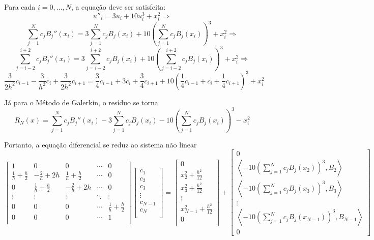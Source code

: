 \documentclass{article}
\begin{document}
    Para cada $i = 0, \dots, N$, a equação deve ser satisfeita:
    $$ u''_i = 3u_i + 10u_i^3 + x_i^2 \Rightarrow$$
    $$ \sum_{j = 1}^Nc_jB_j''(x_i) = 3\sum_{j = 1}^Nc_jB_j(x_i) + 10\left(\sum_{j = 1}^Nc_jB_j(x_i)\right)^3 + x_i^2 \Rightarrow$$
    $$ \sum_{j = i - 2}^{i + 2}c_jB_j''(x_i) = 3\sum_{j = i - 2}^{i + 2}c_jB_j(x_i) + 10\left(\sum_{j = i - 2}^{i + 2}c_jB_j(x_i)\right)^3 + x_i^2 \Rightarrow$$
    $$ \frac{3}{2h^2} c_{i-1} - \frac{3}{h^2} c_i + \frac{3}{2h^2} c_{i+1} = \frac{3}{4} c_{i-1} + 3c_i + \frac{3}{4} c_{i+1} + 10\left(\frac{1}{4} c_{i-1} + c_i + \frac{1}{4} c_{i+1}\right)^3 + x_i^2$$

    Já para o Método de Galerkin, o resíduo se torna
    $$ R_N(x) = \sum_{j = 1}^Nc_jB_j''(x_i) - 3\sum_{j = 1}^Nc_jB_j(x_i) - 10\left(\sum_{j = 1}^Nc_jB_j(x_i)\right)^3 - x_i^2 $$

    Portanto, a equação diferencial se reduz ao sistema não linear
    $$ \begin{bmatrix}
        1 & 0 & 0 & \cdots & 0 \\
        \frac{1}{h}+\frac{h}{2} & -\frac{2}{h} + 2h & \frac{1}{h}+\frac{h}{2} & \cdots & 0 \\
        0 & \frac{1}{h}+\frac{h}{2} & -\frac{2}{h} + 2h & \cdots & 0 \\
        \vdots & \vdots & \vdots & \ddots & \vdots \\
        0 & 0 & 0 & \cdots & \frac{1}{h}+\frac{h}{2} \\
        0 & 0 & 0 & \cdots & 1 \\
    \end{bmatrix}\begin{bmatrix}
        c_1 \\ c_2 \\ c_3 \\ \vdots \\ c_{N-1} \\ c_N \\
    \end{bmatrix} = \begin{bmatrix}
        0 \\ x_2^2 + \frac{h^2}{12} \\ x_3^2 + \frac{h^2}{12} \\ \vdots \\ x_{N - 1}^2 + \frac{h^2}{12} \\ 0 \\
    \end{bmatrix} + \begin{bmatrix}
        0 \\ \left\langle - 10\left(\sum_{j = 1}^Nc_jB_j(x_2)\right)^3, B_2 \right\rangle \\
        \left\langle - 10\left(\sum_{j = 1}^Nc_jB_j(x_3)\right)^3, B_3 \right\rangle \\ \vdots \\
        \left\langle - 10\left(\sum_{j = 1}^Nc_jB_j(x_{N-1})\right)^3, B_{N-1} \right\rangle \\ 0
    \end{bmatrix}$$
\end{document}
